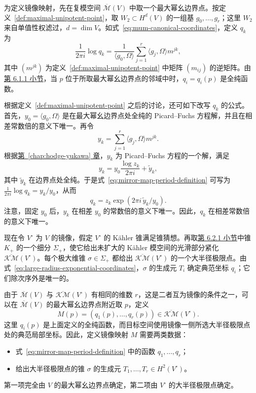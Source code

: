 为定义镜像映射，先在复模空间 $\overline{\mathcal M}(V)$ 中取一个最大幂幺边界点。按定义~\ref{def:maximal-unipotent-point}，取 $W_2\subset H^d(V)$ 的一组基 $g_0,\ldots,g_r$；这里 $W_2$ 来自单值性权滤过，$d=\dim V$。如式~\eqref{eq:mum-canonical-coordinates}，定义 $q_k$ 为
\begin{equation}\label{eq:mirror-map-period-definition}
\frac{1}{2\pi i}\log q_k
=\frac{1}{\langle g_0,\Omega\rangle}\sum_{j=1}^r\langle g_j,\Omega\rangle m^{jk},
\end{equation}
其中 $(m^{jk})$ 为定义~\ref{def:maximal-unipotent-point} 中矩阵 $(m_{ij})$ 的逆矩阵。由\hyperref[subsec:mum-boundary-points]{第 6.1.1 小节}，当 $p$ 位于所取最大幂幺边界点的邻域中时，$q_i=q_i(p)$ 是全纯函数。

根据定义~\ref{def:maximal-unipotent-point} 之后的讨论，还可如下改写 $q_k$ 的公式。首先，$y_0=\langle g_0,\Omega\rangle$ 是在最大幂幺边界点处全纯的 Picard--Fuchs 方程解，并且在相差常数倍的意义下唯一。再令
\[
y_k=\sum_{j=1}^r\langle g_j,\Omega\rangle m^{jk}.
\]
根据\hyperref[chap:hodge-yukawa]{第~\ref*{chap:hodge-yukawa} 章}，$y_k$ 为 Picard--Fuchs 方程的一个解，满足
\[
y_k=y_0\frac{\log z_k}{2\pi i}+\widetilde y_k,
\]
其中 $\widetilde y_k$ 在边界点处全纯。于是式~\eqref{eq:mirror-map-period-definition} 可写为
$\frac{1}{2\pi i}\log q_k=y_k/y_0$，从而
\begin{equation}\label{eq:mirror-map-holomorphic-correction}
q_k=z_k\exp(2\pi i\,\widetilde y_k/y_0).
\end{equation}
注意，固定 $y_0$ 后，$y_k$ 在相差 $y_0$ 的常数倍的意义下唯一。因此，$q_k$ 在相差常数倍的意义下唯一。

现在令 $V^\circ$ 为 $V$ 的镜像，假定 $V^\circ$ 的 Kähler 锥满足锥猜想。再取\hyperref[subsec:large-radius-limits]{第 6.2.1 小节}中锥 $K_+$ 的一个细分 $\Sigma_+$，使它给出未扩大的 Kähler 模空间的光滑部分紧化 $\overline{\mathcal{KM}}(V^\circ)$。每个极大维锥 $\sigma\in\Sigma_+$ 都给出 $\overline{\mathcal{KM}}(V^\circ)$ 的一个大半径极限点。由式~\eqref{eq:large-radius-exponential-coordinates}，$\sigma$ 的生成元 $T_i$ 确定典范坐标 $q_i$；它们除次序外是唯一的。

由于 $\overline{\mathcal M}(V)$ 与 $\overline{\mathcal{KM}}(V^\circ)$ 有相同的维数 $r$，这是二者互为镜像的条件之一，可以在 $\overline{\mathcal M}(V)$ 的最大幂幺边界点附近取 $p$，定义
\begin{equation}\label{eq:mirror-map-local}
M(p)=(q_1(p),\ldots,q_r(p))\in\overline{\mathcal{KM}}(V^\circ).
\end{equation}
这里 $q_i(p)$ 是上面定义的全纯函数，而目标空间使用镜像一侧所选大半径极限点处的典范局部坐标。因此，定义镜像映射 $M$ 需要两类数据：
\begin{itemize}
\item 式~\eqref{eq:mirror-map-period-definition} 中的函数 $q_1,\ldots,q_r$；
\item 给出大半径极限点的锥 $\sigma$ 的生成元 $T_1,\ldots,T_r\in H^2(V^\circ)$。
\end{itemize}
第一项完全由 $V$ 的最大幂幺边界点确定，第二项由 $V^\circ$ 的大半径极限点确定。

